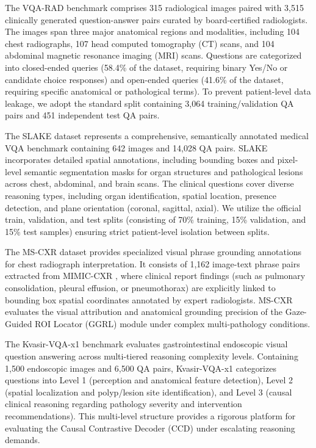 \documentclass[journal,twoside,web]{ieeecolor}
\begin{document}
The VQA-RAD benchmark \cite{lau2018} comprises 315 radiological images paired with 3,515 clinically generated question-answer pairs curated by board-certified radiologists. The images span three major anatomical regions and modalities, including 104 chest radiographs, 107 head computed tomography (CT) scans, and 104 abdominal magnetic resonance imaging (MRI) scans. Questions are categorized into closed-ended queries (58.4\% of the dataset, requiring binary Yes/No or candidate choice responses) and open-ended queries (41.6\% of the dataset, requiring specific anatomical or pathological terms). To prevent patient-level data leakage, we adopt the standard split containing 3,064 training/validation QA pairs and 451 independent test QA pairs.

The SLAKE dataset \cite{liu2021} represents a comprehensive, semantically annotated medical VQA benchmark containing 642 images and 14,028 QA pairs. SLAKE incorporates detailed spatial annotations, including bounding boxes and pixel-level semantic segmentation masks for organ structures and pathological lesions across chest, abdominal, and brain scans. The clinical questions cover diverse reasoning types, including organ identification, spatial location, presence detection, and plane orientation (coronal, sagittal, axial). We utilize the official train, validation, and test splits (consisting of 70\% training, 15\% validation, and 15\% test samples) ensuring strict patient-level isolation between splits.

The MS-CXR dataset \cite{boecking2022} provides specialized visual phrase grounding annotations for chest radiograph interpretation. It consists of 1,162 image-text phrase pairs extracted from MIMIC-CXR \cite{johnson2019mimic}, where clinical report findings (such as pulmonary consolidation, pleural effusion, or pneumothorax) are explicitly linked to bounding box spatial coordinates annotated by expert radiologists. MS-CXR evaluates the visual attribution and anatomical grounding precision of the Gaze-Guided ROI Locator (GGRL) module under complex multi-pathology conditions.

The Kvasir-VQA-x1 benchmark \cite{jha2023} evaluates gastrointestinal endoscopic visual question answering across multi-tiered reasoning complexity levels. Containing 1,500 endoscopic images and 6,500 QA pairs, Kvasir-VQA-x1 categorizes questions into Level 1 (perception and anatomical feature detection), Level 2 (spatial localization and polyp/lesion site identification), and Level 3 (causal clinical reasoning regarding pathology severity and intervention recommendations). This multi-level structure provides a rigorous platform for evaluating the Causal Contrastive Decoder (CCD) under escalating reasoning demands.
\end{document}

